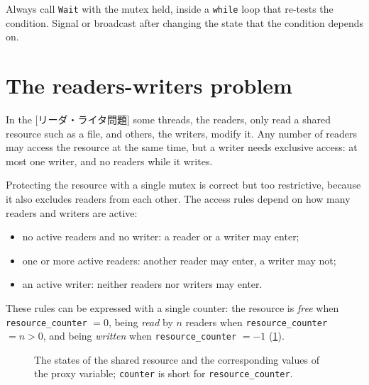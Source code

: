 \documentclass[../main.tex]{subfiles}
\begin{document}
\begin{keypoint}
  Always call \texttt{Wait} with the mutex held, inside a \texttt{while}
  loop that re-tests the condition.  Signal or broadcast after changing the
  state that the condition depends on.
\end{keypoint}

\section{The readers-writers problem}
\label{sec:l03-rw}

In the [リーダ・ライタ問題] some threads, the
readers, only read a shared resource such as a file, and others, the
writers, modify it.  Any
number of readers may access the resource at the same time, but a writer
needs exclusive access: at most one writer, and no readers while it writes.

Protecting the resource with a single mutex is correct but too restrictive,
because it also excludes readers from each other.  The access rules depend
on how many readers and writers are active:
\begin{itemize}
  \item no active readers and no writer: a reader or a writer may enter;
  \item one or more active readers: another reader may enter, a writer
    may not;
  \item an active writer: neither readers nor writers may enter.
\end{itemize}
These rules can be expressed with a single counter: the resource is
\emph{free} when \texttt{resource\_counter} $=0$, being \emph{read} by $n$
readers when \texttt{resource\_counter} $=n>0$, and being \emph{written}
when \texttt{resource\_counter} $=-1$ (\cref{fig:l03-rw-states}).

\begin{figure}[htbp]
  \centering
  
  \caption{The states of the shared resource and the corresponding values
    of the proxy variable; \texttt{counter} is short for
    \texttt{resource\_counter}.}
  \label{fig:l03-rw-states}
\end{figure}
\end{document}
